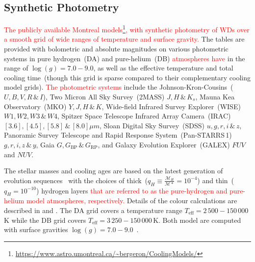 \documentclass[fleqn,usenatbib]{rasti}
\begin{document}
\subsection*{Synthetic Photometry}
\textcolor{red}{The publicly available Montreal models\footnote{\url{https://www.astro.umontreal.ca/~bergeron/CoolingModels/}},
with synthetic photometry of WDs over a smooth grid of wide ranges of temperature
and surface gravity.} The tables are provided with bolometric and absolute magnitudes
on various photometric systems in pure hydrogen~(DA) and pure-helium~(DB)
\textcolor{red}{atmospheres have} in the range of $\log(g)=7.0 - 9.0$, as well as
the effective temperature and total cooling time~(though this grid is sparse
compared to their complementary cooling model grids). \textcolor{red}{The
photometric systems} include the Johnson-Kron-Cousins~($U, B, V, R\,\&\,I$),
Two Micron All Sky Survey~(2MASS) $J, H\,\&\,K_{s}$, Mauna Kea Observatory~(MKO)
$Y, J, H\,\&\,K$, Wide-field Infrared Survey Explorer~(WISE) $W1, W2, W3\,\&\,W4$,
Spitzer Space Telescope Infrared Array Camera~(IRAC)
$[3.6], [4.5], [5.8]\,\&\,[8.0] \mu m$, Sloan Digital Sky Survey~(SDSS)
$u, g, r, i\,\&\,z$, Panoramic Survey Telescope and Rapid Response
System~(Pan-STARRS\,1) $g, r, i, z\,\&\,y$,
Gaia $G, G_{\mathrm{BP}}\,\&\,G_{\mathrm{RP}}$, and Galaxy Evolution
Explorer~(GALEX) $FUV$ and $NUV$.

The stellar masses and cooling ages are based on the latest generation of
evolution sequences~\citep{2020ApJ...901...93B} with the choices of
thick~($q_H \equiv \frac{\mathcal{M}_H}{\mathcal{M}*} = 10^{-4}$) and thin~($q_H = 10^{-10}$)
hydrogen layers \textcolor{red}{that are referred to as the pure-hydrogen and
pure-helium model atmospheres, respectively.} Details of the colour calculations
are described in \citet{1995PASP..107.1047B} and \citet{2006AJ....132.1221H}.
The DA grid covers a temperature range $T_{\mathrm{eff}} = 2\,500 - 150\,000$\,K
while the DB grid covers $T_{\mathrm{eff}} = 3\,250 - 150\,000$\,K. Both model
are computed with surface gravities $\log(g) = 7.0 - 9.0$~\citep{
2018ApJ...863..184B, 2020ApJ...901...93B, 2011ApJ...730..128T,
2011ApJ...737...28B, 2006ApJ...651L.137K}.
\end{document}
